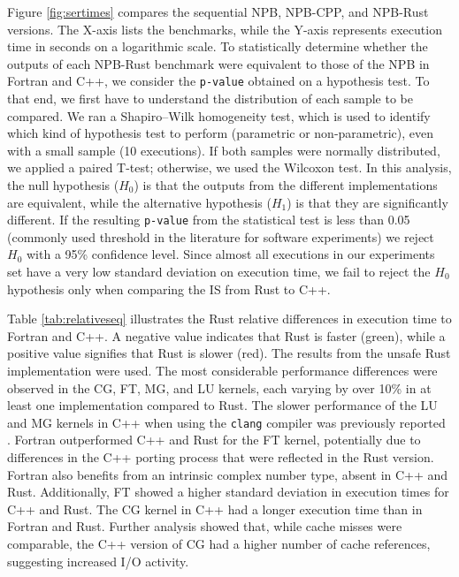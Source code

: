     Figure \ref{fig:sertimes} compares the sequential NPB, NPB-CPP, and NPB-Rust versions. The X-axis lists the benchmarks, while the Y-axis represents execution time in seconds on a logarithmic scale. To statistically determine whether the outputs of each NPB-Rust benchmark were equivalent to those of the NPB in Fortran and C++, we consider the \texttt{p-value} obtained on a hypothesis test. To that end, we first have to understand the distribution of each sample to be compared. We ran a Shapiro–Wilk homogeneity test, which is used to identify which kind of hypothesis test to perform (parametric or non-parametric), even with a small sample (10 executions). If both samples were normally distributed, we applied a paired T-test; otherwise, we used the Wilcoxon test. In this analysis, the null hypothesis ($H_0$) is that the outputs from the different implementations are equivalent, while the alternative hypothesis ($H_1$) is that they are significantly different. If the resulting \texttt{p-value} from the statistical test is less than 0.05 (commonly used threshold in the literature for software experiments) we reject $H_0$ with a 95\% confidence level. Since almost all executions in our experiments set have a very low standard deviation on execution time, we fail to reject the $H_0$ hypothesis only when comparing the IS from Rust to C++.


    

    Table \ref{tab:relativeseq} illustrates the Rust relative differences in execution time to Fortran and C++. A negative value indicates that Rust is faster (green), while a positive value signifies that Rust is slower (red). The results from the unsafe Rust implementation were used. The most considerable performance differences were observed in the CG, FT, MG, and LU kernels, each varying by over 10\% in at least one implementation compared to Rust. The slower performance of the LU and MG kernels in C++ when using the \texttt{clang} compiler was previously reported \cite{NPB-CPP-2021}. Fortran outperformed C++ and Rust for the FT kernel, potentially due to differences in the C++ porting process that were reflected in the Rust version. Fortran also benefits from an intrinsic complex number type, absent in C++ and Rust. Additionally, FT showed a higher standard deviation in execution times for C++ and Rust. The CG kernel in C++ had a longer execution time than in Fortran and Rust. Further analysis showed that, while cache misses were comparable, the C++ version of CG had a higher number of cache references, suggesting increased I/O activity.

